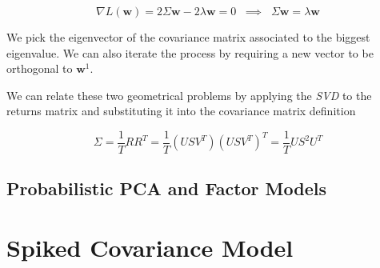 \documentclass{article}
\numberwithin{equation}{subsection}
\begin{document}
\begin{equation*}
    \nabla L(\mathbf{w}) = 2 \Sigma \mathbf{w} - 2 \lambda \mathbf{w} = 0 \;\; \implies \;\; \Sigma \mathbf{w} = \lambda \mathbf{w}
\end{equation*}

We pick the eigenvector of the covariance matrix associated to the biggest eigenvalue. We can also iterate the process by requiring a new vector to be orthogonal to $\mathbf{w}^{1}$.

We can relate these two geometrical problems by applying the \textit{SVD} to the returns matrix and substituting it into the covariance matrix definition 

\begin{equation*}
    \Sigma = \frac{1}{T} R R^T = \frac{1}{T} (U S V^T) (U S V^T)^T = \frac{1}{T} U S^2 U^T
\end{equation*}

\subsection{Probabilistic PCA and Factor Models}

\section{Spiked Covariance Model}
\end{document}
